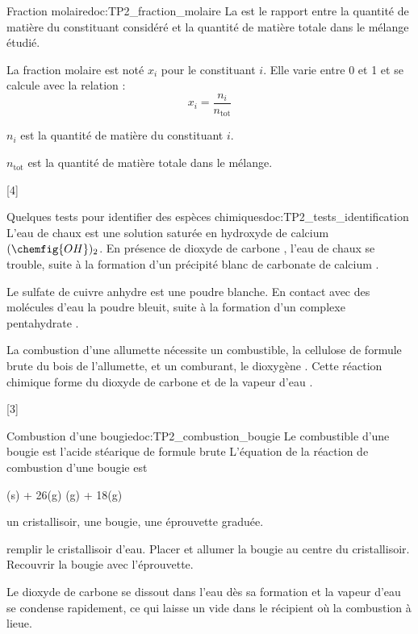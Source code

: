 \begin{doc}{Fraction molaire}{doc:TP2_fraction_molaire}
  La  est le rapport entre la quantité de matière du constituant considéré et la quantité de matière totale dans le mélange étudié.

  La fraction molaire est noté $x_i$ pour le constituant $i$. Elle varie entre 0 et 1 et se calcule avec la relation :
  \begin{equation*}
    x_i = \dfrac{n_i}{n_\text{tot}}
  \end{equation*}

  $n_i$ est la quantité de matière du constituant $i$.

  $n_\text{tot}$ est la quantité de matière totale dans le mélange.
\end{doc}

[4]


\begin{doc}{Quelques tests pour identifier des espèces chimiques}{doc:TP2_tests_identification}
  \pointCyan L'eau de chaux est une solution saturée en hydroxyde de calcium  $(\chemfig{OH})_2$.
  En présence de dioxyde de carbone , l'eau de chaux se trouble, suite à la formation d'un précipité blanc de carbonate de calcium .

  \pointCyan Le sulfate de cuivre anhydre  est une poudre blanche.
  En contact avec des molécules d'eau  la poudre bleuit, suite à la formation d'un complexe pentahydrate .

  \pointCyan La combustion d'une allumette nécessite un combustible, la cellulose de formule brute  du bois de l'allumette, et un comburant, le dioxygène .
  Cette réaction chimique forme du dioxyde de carbone  et de la vapeur d'eau .
\end{doc}

[3]


\begin{doc}{Combustion d'une bougie}{doc:TP2_combustion_bougie}
  Le combustible d'une bougie est l'acide stéarique de formule brute 
  L'équation de la réaction de combustion d'une bougie est
  \begin{center}
    (s) + 26(g) (g) + 18(g)
  \end{center}

   un cristallisoir, une bougie, une éprouvette graduée.

   remplir le cristallisoir d'eau.
  Placer et allumer la bougie au centre du cristallisoir.
  Recouvrir la bougie avec l'éprouvette.

  Le dioxyde de carbone se dissout dans l'eau dès sa formation et la vapeur d'eau se condense rapidement, ce qui laisse un vide dans le récipient où la combustion à lieue.
\end{doc}

